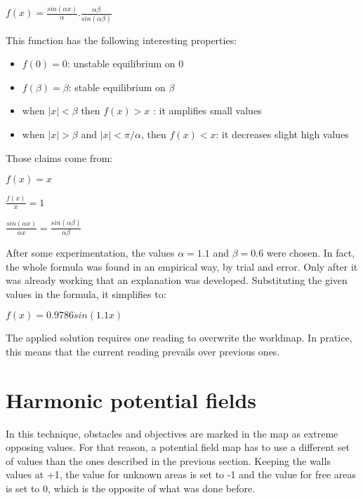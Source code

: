 \documentclass[a4paper,twocolumn]{article}
\begin{document}
    \begin{math}
        f(x) = \frac{sin(\alpha x)}{\alpha} . \frac{\alpha\beta}{sin(\alpha\beta)}
    \end{math}

    This function has the following interesting properties: 
    \begin{itemize}
        \item $f(0) = 0$: unstable equilibrium on 0
        \item $f(\beta) = \beta$: stable equilibrium on $\beta$
        \item when $|x| < \beta$ then $f(x) > x$ : it amplifies small values
        \item when $|x| > \beta$ and $|x|< \pi/\alpha$, then $f(x) < x $: it decreases slight high values
    \end{itemize}

    Those claims come from:

    \begin{math}
        f(x) = x 
    \end{math}

    \begin{math}
        \frac{f(x)}{x} = 1
    \end{math}

    \begin{math}
        \frac{sin(\alpha x)}{\alpha x} = \frac{sin(\alpha\beta)}{\alpha\beta}
    \end{math}

    After some experimentation, the values $\alpha = 1.1$ and $\beta = 0.6$ were chosen. In fact, the whole formula was found in an empirical way, by trial and error. Only after it was already working that an explanation was developed. Substituting the given values in the formula, it simplifies to:
    
    \begin{math}
        f(x) = 0.9786 sin(1.1 x)
    \end{math}

    The applied solution requires one reading to overwrite the worldmap. In pratice, this means that the current reading prevails over previous ones. 
    
\section{Harmonic potential fields}
    In this technique, obstacles and objectives are marked in the map as extreme opposing values. For that reason, a potential field map has to use a different set of values than the ones described in the previous section. Keeping the walls values at +1, the value for unknown areas is set to -1 and the value for free areas is set to 0, which is the opposite of what was done before.
\end{document}
